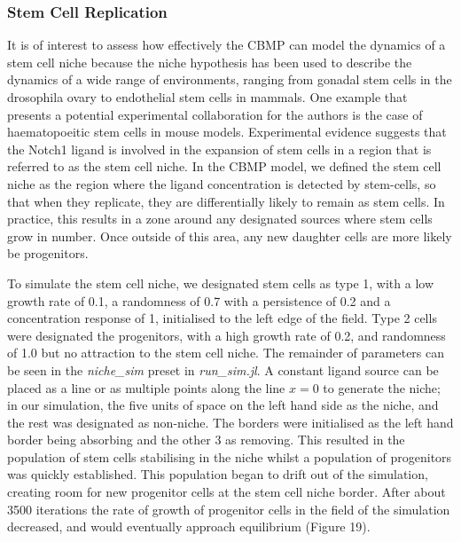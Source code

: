 \documentclass[12pt]{article}
\begin{document}
\subsubsection{Stem Cell Replication}
It is of interest to assess how effectively the CBMP can model the 
dynamics of a stem cell niche because the niche hypothesis has been used 
to describe the dynamics of a wide range of environments, ranging from 
gonadal stem cells in the drosophila ovary to endothelial stem cells in 
mammals.\cite{linheng05} One example that presents a potential experimental 
collaboration for the authors is the case of haematopoeitic stem cells in 
mouse models. Experimental evidence suggests that the Notch1 ligand is 
involved in the expansion of stem cells in a region that is referred to 
as the stem cell niche.\cite{calvi03} In the CBMP model, we defined the stem cell 
niche as the region where the ligand concentration is detected by stem-cells,
so that when they replicate, they are differentially likely to remain as
stem cells. In practice, this 
results in a zone around any designated sources where stem cells grow in 
number. Once outside of this area, any new daughter cells are more 
likely be progenitors. 

To simulate the stem cell niche, we designated stem cells as type 1, 
with a low growth rate of 0.1, a randomness of 0.7 with a persistence of 
0.2 and a concentration response of 1, initialised to the left edge of 
the field. Type 2 cells were designated the progenitors, with a high 
growth rate of 0.2, and randomness of 1.0 but no attraction to the stem 
cell niche. The remainder of parameters can be seen in the {\itshape 
niche\_sim} preset in {\itshape run\_sim.jl}. A constant ligand source can be 
placed as a line or as multiple points along the line \(x=0\) to generate the 
niche; in our simulation, the five units of space on the left hand side 
as the niche, and the rest was designated as non-niche. The borders were 
initialised as the left hand border being absorbing and the other 3 as 
removing. This resulted in the population of stem cells stabilising in 
the niche whilst a population of progenitors was quickly established. 
This population began to drift out of the simulation, creating room for 
new progenitor cells at the stem cell niche border. After about 3500 
iterations the rate of growth of progenitor cells in the field of the 
simulation decreased, and would eventually approach equilibrium (Figure 
19).
\end{document}
